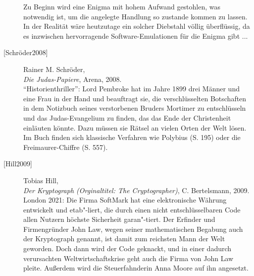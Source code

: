 \begin{refsegment}
\begin{description}
    Zu Beginn wird eine Enigma mit hohem Aufwand gestohlen, was notwendig ist,
    um die angelegte Handlung so zustande kommen zu lassen. In der Realität
    wäre heutzutage ein solcher Diebstahl völlig überflüssig, da es inzwischen
    hervorragende Software-Emulationen für die Enigma gibt ... \\


\item[\textrm{[Schröder2008]}] 
    Rainer M. Schröder, \\
    {\em Die Judas-Papiere}, Arena, 2008. \\
    "`Historienthriller"': Lord Pembroke hat im Jahre 1899 drei Männer und eine Frau
    in der Hand und beauftragt sie, die verschlüsselten Botschaften in dem Notizbuch
    seines verstorbenen Bruders Mortimer zu entschlüsseln und das Judas-Evangelium
    zu finden, das das Ende der Christenheit einläuten könnte. Dazu müssen sie
    Rätsel an vielen Orten der Welt lösen.
    Im Buch finden sich klassische Verfahren wie Polybius (S. 195) oder die
    Freimaurer-Chiffre (S. 557).\\


\item[\textrm{[Hill2009]}] 
    Tobias Hill, \\
    {\em Der Kryptograph (Orginaltitel: The Cryptographer)}, C. Bertelsmann, 2009. \\
    London 2021: Die Firma SoftMark hat eine elektronische Währung entwickelt
    und etab"-liert, die durch einen nicht entschlüsselbaren Code allen Nutzern
    höchste Sicherheit garan"-tiert.
    Der Erfinder und Firmengründer John Law, wegen seiner mathematischen Begabung
    auch der Kryptograph genannt, ist damit zum reichsten Mann der Welt geworden.
    Doch dann wird der Code geknackt, und in einer dadurch verursachten
    Weltwirtschaftskrise geht auch die Firma von John Law pleite. Außerdem wird
    die Steuerfahnderin Anna Moore auf ihn angesetzt.\\



\end{description}
\end{refsegment}
